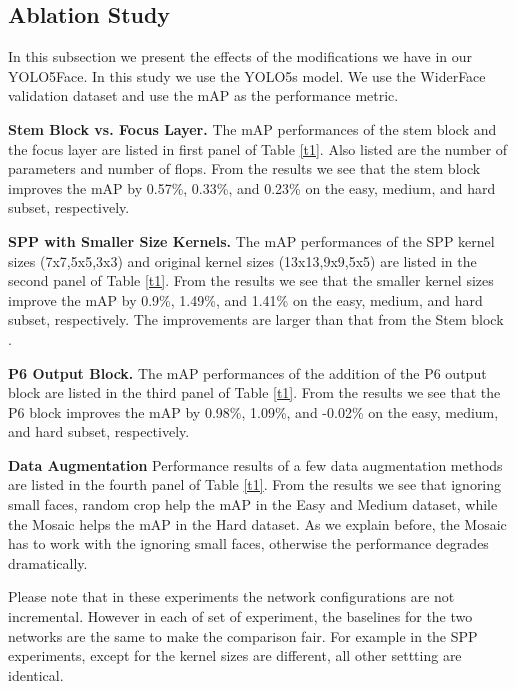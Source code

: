\documentclass[conference]{IEEEtran}
\begin{document}
\subsection{Ablation Study}
In this subsection we present the effects of the modifications we have in our YOLO5Face. In this study we use the YOLO5s model. We use the WiderFace \cite{WiderFace} validation dataset and use the mAP as the performance metric. 



\textbf{Stem Block vs. Focus Layer.} The mAP performances of the stem block \cite{Stem} and the focus layer are listed in first panel of Table \ref{t1}. Also listed are the number of parameters and number of flops. From the results we see that the stem block improves the mAP by 0.57\%, 0.33\%, and 0.23\% on the easy, medium, and hard subset, respectively.  

\textbf{SPP with Smaller Size Kernels.} The mAP performances of the SPP \cite{SPP} kernel sizes (7x7,5x5,3x3) and original kernel sizes (13x13,9x9,5x5) are listed in the second panel of Table \ref{t1}. From the results we see that the smaller kernel sizes improve the mAP by 0.9\%, 1.49\%, and 1.41\% on the easy, medium, and hard subset, respectively. The improvements are larger than that from the Stem block \cite{Stem}.   

\textbf{P6 Output Block.} The mAP performances of the addition of the P6 output block are listed in the third panel of Table \ref{t1}. From the results we see that the P6 block improves the mAP by 0.98\%, 1.09\%, and -0.02\% on the easy, medium, and hard subset, respectively.

\textbf{Data Augmentation} Performance results of a few data augmentation methods are listed in the fourth panel of Table \ref{t1}. From the results we see that ignoring small faces, random crop help the mAP in the Easy and Medium dataset, while the Mosaic \cite{YOLOv4} helps the mAP in the Hard dataset. As we explain before, the Mosaic has to work with the ignoring small faces, otherwise the performance degrades dramatically.

Please note that in these experiments the network configurations are not incremental. However in each of set of experiment, the baselines for the two networks are the same to make the comparison fair. For example in the SPP experiments, except for the kernel sizes are different, all other settting are identical.  
\end{document}

